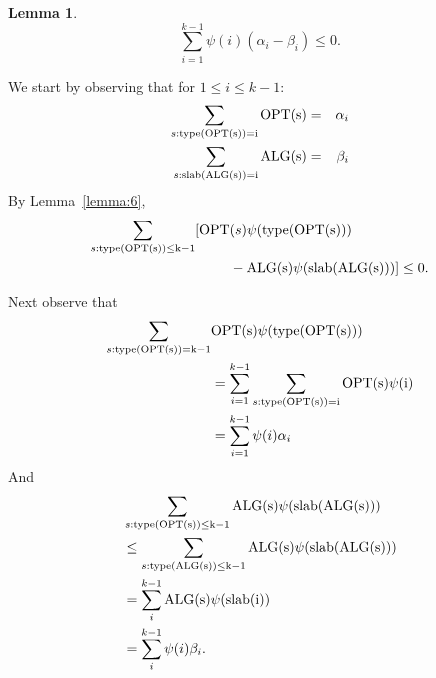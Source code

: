 \documentclass[conference]{IEEEtran}
\newtheorem{lemma}{Lemma}
\def \OPT {\rm{OPT}}
\def \ALG {\rm{ALG}}
\def \slab {\rm{slab}}
\def \type {\rm{type}}
\begin{document}
  \begin{lemma}
    \begin{equation*}
      \sum_{i=1}^{k-1}\psi(i)(\alpha_i-\beta_i)\leq 0.
    \end{equation*}
  \end{lemma}
  \begin{IEEEproof}
    We start by observing that for $1\leq i\leq k-1$:
    \begin{eqnarray*}
      \sum_{s:\type(\OPT(s))=i}\OPT(s)&=&\alpha_i\\
      \sum_{s:\slab(\ALG(s))=i}\ALG(s)&=&\beta_i
    \end{eqnarray*}
    By Lemma~\ref{lemma:6},
    \begin{equation*}
    \begin{split}
      \sum_{s:\type(\OPT(s))\leq k-1}[\OPT&(s)\psi(\type(\OPT(s)))\\
      &-\ALG(s)\psi(\slab(\ALG(s)))]\leq0.
    \end{split}
    \end{equation*}

    Next observe that
    \begin{equation*}
      \begin{split}
      \sum_{s:\type(\OPT(s))=k-1}&\OPT(s)\psi(\type(\OPT(s)))\\
      &=\sum_{i=1}^{k-1}\sum_{s:\type(\OPT(s))=i}\OPT(s)\psi(i)\\
      &=\sum_{i=1}^{k-1}\psi(i)\alpha_i\\
      \end{split}
    \end{equation*}
    And
    \begin{equation*}
      \begin{split}
      &\sum_{s:\type(\OPT(s))\leq k-1}\ALG(s)\psi(\slab(\ALG(s)))\\
      &\leq\sum_{s:\type(\ALG(s))\leq k-1}\ALG(s)\psi(\slab(\ALG(s)))\\
      &=\sum_{i}^{k-1} \ALG(s)\psi(\slab(i))\\
      &=\sum_{i}^{k-1}\psi(i)\beta_i.
      \end{split}
    \end{equation*}
  \end{IEEEproof}
\end{document}
